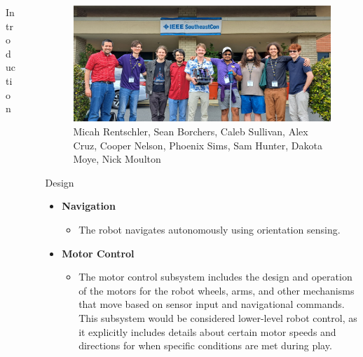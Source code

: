 \documentclass[final]{beamer}
\newlength{\sepwidth}
\newlength{\colwidth}
\newcommand{\separatorcolumn}{\begin{column}{\sepwidth}\end{column}}
\begin{document}
\begin{frame}[t]
\begin{columns}[t]
\begin{column}{\colwidth}
\begin{block}{Introduction}
  \end{block}
 

\end{column}

\separatorcolumn

\begin{column}{\colwidth}

    \begin{figure}
      \centering
      \includegraphics[width=30.0cm]{Team Picture SECON 2025.jpg}
      \caption{Micah Rentschler, Sean Borchers, Caleb Sullivan, Alex Cruz, Cooper Nelson, Phoenix Sims, Sam Hunter, Dakota Moye, Nick Moulton}
    \end{figure}

    \begin{block}{Design}
    \begin{itemize}
    
      \item \textbf{Navigation}
        \begin{itemize}
          \item The robot navigates autonomously using orientation sensing.
        \end{itemize}
        
      \item \textbf{Motor Control}
        \begin{itemize}
          \item The motor control subsystem includes the design and operation of the motors for the robot wheels, arms, and other mechanisms that move based on sensor input and navigational commands. This subsystem would be considered lower-level robot control, as it explicitly includes details about certain motor speeds and directions for when specific conditions are met during play.
        \end{itemize}
      

\end{itemize}
\end{block}
\end{column}
\end{columns}
\end{frame}
\end{document}
